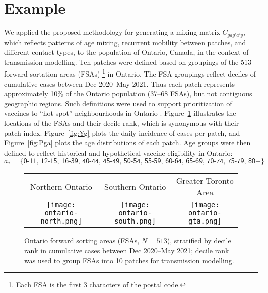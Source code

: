 \section{Example}\label{ex}
We applied the proposed methodology for generating a mixing matrix $C_{gag'a'y}$,
which reflects patterns of age mixing, recurrent mobility between patches, and different contact types,
to the population of Ontario, Canada, in the context of \covid transmission modelling.
Ten patches were defined based on groupings of the 513 forward sortation areas (FSAs)%
\footnote{Each FSA is the first 3 characters of the postal code.} in Ontario.
The FSA groupings reflect deciles of cumulative \covid cases between Dec 2020--May 2021.
Thus each patch represents approximately 10\% of the Ontario population (\mbox{37--68} FSAs),
but not contiguous geographic regions.
Such definitions were used to support prioritization of \covid vaccines
to ``hot spot'' neighbourhoods in Ontario \cite{Mishra2021}.
Figure~\ref{fig:map} illustrates the locations of the FSAs and their decile rank,
which is synonymous with their patch index.
Figure~\ref{fig:Yg} plots the daily incidence of \covid cases per patch, and
Figure~\ref{fig:Pga} plots the age distributions of each patch.
Age groups were then defined to reflect historical and hypothetical \covid vaccine eligibility in Ontario:
\begin{equation}
  a_* = \big\{\textsf{0-11, 12-15, 16-39, 40-44, 45-49, 50-54, 55-59, 60-64, 65-69, 70-74, 75-79, 80+}\big\}
\end{equation}
\begin{figure}
  \centering
  \setlength{\tabcolsep}{0pt}
  \begin{tabular}{ccc}
    Northern Ontario & Southern Ontario & Greater Toronto Area\\
    \texttt{[image: ontario-north.png]} &
    \texttt{[image: ontario-south.png]} &
    \texttt{[image: ontario-gta.png]}
  \end{tabular}
  \caption{Ontario forward sorting areas (FSAs, $N=513$),
    stratified by decile rank in cumulative \covid cases between Dec 2020--May 2021;
    decile rank was used to group FSAs into 10 patches for transmission modelling.}
  \label{fig:map}
\end{figure}
